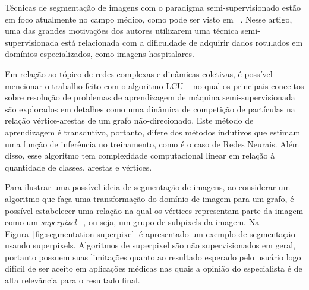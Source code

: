 Técnicas de segmentação de imagens com o paradigma semi-supervisionado
estão em foco atualmente no campo médico, como pode ser visto em
~. Nesse artigo, uma das grandes
motivações dos autores utilizarem uma técnica semi-supervisionada
está relacionada com a dificuldade de adquirir dados rotulados em
domínios especializados, como imagens hospitalares.

Em relação ao tópico de redes complexas e dinâmicas coletivas, é
possível mencionar o trabalho feito com o algoritmo \gls{LCU}
~\cite{VerriNetworkUnfoldingMap2018} no qual os principais conceitos
sobre resolução de problemas de aprendizagem de máquina
semi-supervisionada são explorados em detalhes como uma dinâmica de
competição de partículas na relação vértice-arestas de um grafo
não-direcionado. Este método de aprendizagem é transdutivo, portanto,
difere dos métodos indutivos que estimam uma função de inferência no
treinamento, como é o caso de Redes Neurais. Além disso, esse
algoritmo tem complexidade computacional linear em relação à
quantidade de classes, arestas e vértices.

Para ilustrar uma possível ideia de segmentação de imagens, ao
considerar um algoritmo que faça uma transformação do domínio de
imagem para um grafo, é possível estabelecer uma relação na qual os
vértices representam parte da imagem como um \textit{superpixel}
~\cite{SuperpixelSurvey2020}, ou seja, um grupo de subpixels da
imagem. Na Figura~\ref{fig:segmentation-superpixel} é apresentado um
exemplo de segmentação usando superpixels. Algoritmos de superpixel
são não supervisionados em geral, portanto possuem suas limitações
quanto ao resultado esperado pelo usuário \textendash\hfill logo
difícil de ser aceito em aplicações médicas nas quais a opinião do
especialista é de alta relevância para o resultado final.

\begin{figure}[!h]
        \captionsetup{width=9cm}
		\centering
\end{figure}



